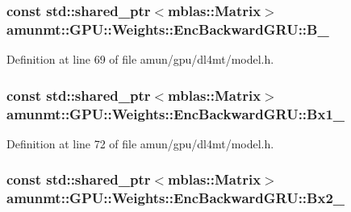 \subsubsection[{\texorpdfstring{B\+\_\+}{B_}}]{\setlength{\rightskip}{0pt plus 5cm}const std\+::shared\+\_\+ptr$<${\bf mblas\+::\+Matrix}$>$ amunmt\+::\+G\+P\+U\+::\+Weights\+::\+Enc\+Backward\+G\+R\+U\+::\+B\+\_\+}\hypertarget{structamunmt_1_1GPU_1_1Weights_1_1EncBackwardGRU_ae151250d33028fbe8ed533c00439c4fb}{}\label{structamunmt_1_1GPU_1_1Weights_1_1EncBackwardGRU_ae151250d33028fbe8ed533c00439c4fb}


Definition at line 69 of file amun/gpu/dl4mt/model.\+h.

\subsubsection[{\texorpdfstring{Bx1\+\_\+}{Bx1_}}]{\setlength{\rightskip}{0pt plus 5cm}const std\+::shared\+\_\+ptr$<${\bf mblas\+::\+Matrix}$>$ amunmt\+::\+G\+P\+U\+::\+Weights\+::\+Enc\+Backward\+G\+R\+U\+::\+Bx1\+\_\+}\hypertarget{structamunmt_1_1GPU_1_1Weights_1_1EncBackwardGRU_a875fa1161c4f97d7089c7117d4c8acd4}{}\label{structamunmt_1_1GPU_1_1Weights_1_1EncBackwardGRU_a875fa1161c4f97d7089c7117d4c8acd4}


Definition at line 72 of file amun/gpu/dl4mt/model.\+h.

\subsubsection[{\texorpdfstring{Bx2\+\_\+}{Bx2_}}]{\setlength{\rightskip}{0pt plus 5cm}const std\+::shared\+\_\+ptr$<${\bf mblas\+::\+Matrix}$>$ amunmt\+::\+G\+P\+U\+::\+Weights\+::\+Enc\+Backward\+G\+R\+U\+::\+Bx2\+\_\+}\hypertarget{structamunmt_1_1GPU_1_1Weights_1_1EncBackwardGRU_a5e17f82500b41f0ecf95b830e59ffb14}{}\label{structamunmt_1_1GPU_1_1Weights_1_1EncBackwardGRU_a5e17f82500b41f0ecf95b830e59ffb14}


